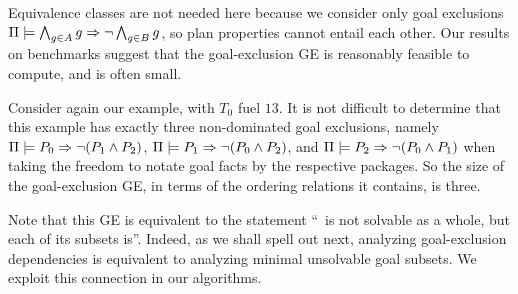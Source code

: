 Equivalence classes are not needed here because we consider only goal
exclusions $\Pi \models \bigwedge_{g \in A} g \Rightarrow \neg \bigwedge_{g
    \in B} g$, so plan properties cannot entail each other.
%
%
%
%
%
%
Our results on benchmarks suggest that the goal-exclusion GE is
reasonably feasible to compute, and is often small.

Consider again our example, with $T_0$ fuel $13$. It is not difficult
to determine that this example has exactly three non-dominated goal
exclusions, namely $\Pi \models P_0 \Rightarrow \neg (P_1 \wedge P_2)$,
$\Pi \models P_1 \Rightarrow \neg (P_0 \wedge P_2)$, and
$\Pi \models P_2 \Rightarrow \neg (P_0 \wedge P_1)$ when taking the freedom
to notate goal facts by the respective packages.
%
%
So the size of the goal-exclusion GE, in terms of the ordering
relations it contains, is three. 

Note that this GE is equivalent to the statement ``\goalsoft\ is not
solvable as a whole, but each of its subsets is''. Indeed, as we shall
spell out next, analyzing goal-exclusion dependencies is equivalent to
analyzing minimal unsolvable goal subsets. We exploit this connection
in our algorithms.
